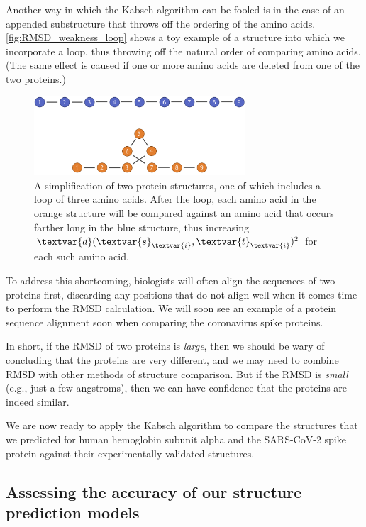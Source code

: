 Another way in which the Kabsch algorithm can be fooled is in the case of an appended substructure that throws off the ordering of the amino acids. \autoref{fig:RMSD_weakness_loop} shows a toy example of a structure into which we incorporate a loop, thus throwing off the natural order of comparing amino acids. (The same effect is caused if one or more amino acids are deleted from one of the two proteins.)\\

\begin{figure}[h]
	\centering
	\mySfFamily
	\includegraphics[width = 0.7\textwidth]{../images/RMSD_weakness_loop.png}
	\caption{A simplification of two protein structures, one of which includes a loop of three amino acids. After the loop, each amino acid in the orange structure will be compared against an amino acid that occurs farther long in the blue structure, thus increasing $\textvar{d}(\textvar{s}_{\textvar{i}}, \textvar{t}_{\textvar{i}})^\text{2}$ for each such amino acid.}
	\label{fig:RMSD_weakness_loop}
\end{figure}

To address this shortcoming, biologists will often align the sequences of two proteins first, discarding any positions that do not align well when it comes time to perform the RMSD calculation. We will soon see an example of a protein sequence alignment soon when comparing the coronavirus spike proteins.

In short, if the RMSD of two proteins is \textit{large}, then we should be wary of concluding that the proteins are very different, and we may need to combine RMSD with other methods of structure comparison. But if the RMSD is \textit{small} (e.g., just a few angstroms), then we can have confidence that the proteins are indeed similar.

We are now ready to apply the Kabsch algorithm to compare the structures that we predicted for human hemoglobin subunit alpha and the SARS-CoV-2 spike protein against their experimentally validated structures. 

\FloatBarrier
{}
\subsection{Assessing the accuracy of our structure prediction models}

